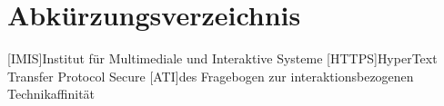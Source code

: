 
\cleardoublepage
{}
{}
\chapter*{Abkürzungsverzeichnis}
\label{section-abbrevs}



\begin{acronym}[CoLab]
  [IMIS]{Institut für Multimediale und Interaktive Systeme}
  [HTTPS]{HyperText Transfer Protocol Secure}
  [ATI]{des Fragebogen zur interaktionsbezogenen Technikaffinität}
\end{acronym}
